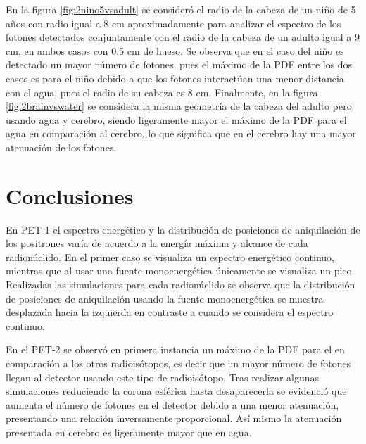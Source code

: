\documentclass[12pt,a4paper,onecolumn]{article}
\begin{document}
En la figura \ref{fig:2nino5vsadult} se consideró el radio de la cabeza de un niño de 5 años con radio igual a 8 cm aproximadamente para analizar el espectro de los fotones detectados conjuntamente con el radio de la cabeza de un adulto igual a 9 cm, en ambos casos con 0.5 cm de hueso. Se observa que en el caso del niño es detectado un mayor número de fotones, pues el máximo de la PDF entre los dos casos es para el niño debido a que los fotones interactúan una menor distancia con el agua, pues el radio de su cabeza es 8 cm. Finalmente, en la figura \ref{fig:2brainvswater} se considera la misma geometría de la cabeza del adulto pero usando agua y cerebro, siendo ligeramente mayor el máximo de la PDF para el agua en comparación al cerebro, lo que significa que en el cerebro hay una mayor atenuación de los fotones.


\section{Conclusiones}
En PET-1 el espectro energético y la distribución de posiciones de aniquilación de los positrones varía de acuerdo a la energía máxima y alcance de cada radionúclido. En el primer caso se visualiza un espectro energético continuo, mientras que al usar una fuente monoenergética únicamente se visualiza un pico. Realizadas las simulaciones para cada radionúclido se observa que la distribución de posiciones de aniquilación usando la fuente monoenergética se muestra desplazada hacia la izquierda en contraste a cuando se considera el espectro continuo.

En el PET-2 se observó en primera instancia un máximo de la PDF para el  en comparación a los otros radioisótopos, es decir que un mayor número de fotones llegan al detector usando este tipo de radioisótopo. Tras realizar algunas simulaciones reduciendo la corona esférica hasta desaparecerla se evidenció que aumenta el número de fotones en el detector debido a una menor atenuación, presentando una relación inversamente proporcional. Así mismo la atenuación presentada en cerebro es ligeramente mayor que en agua.



\end{document}
